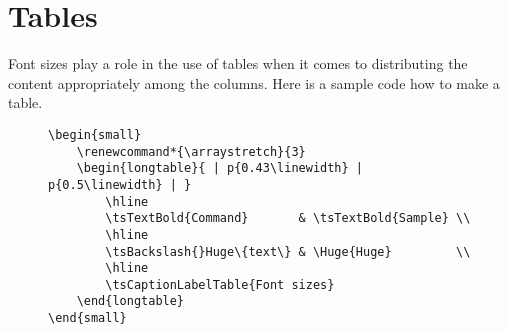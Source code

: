 
\section{Tables}

Font sizes play a role in the use of tables when it comes to distributing
the content appropriately among the columns. Here is a sample code how to
make a table.

\begin{figure}[H]
    \small
    \centering
    \begin{BVerbatim}
\begin{small}
    \renewcommand*{\arraystretch}{3}
    \begin{longtable}{ | p{0.43\linewidth} | p{0.5\linewidth} | }
        \hline
        \tsTextBold{Command}       & \tsTextBold{Sample} \\
        \hline
        \tsBackslash{}Huge\{text\} & \Huge{Huge}         \\
        \hline
        \tsCaptionLabelTable{Font sizes}
    \end{longtable}
\end{small}
    \end{BVerbatim}
\end{figure}


